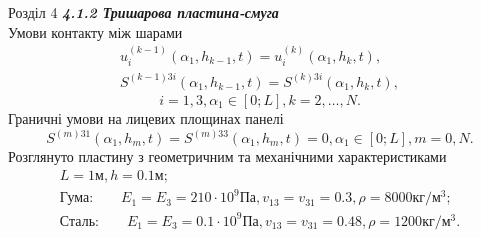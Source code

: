 \documentclass[8pt]{beamer}
\numberwithin{figure}{section}
\numberwithin{equation}{section}
\numberwithin{table}{section}
\begin{document}
\begin{frame}{Розділ 4}
\textbf{\textit{4.1.2 Тришарова пластина-смуга}}
\\
Умови контакту між шарами
\begin{gather}
u_i^{(k-1)}\left(\alpha_1, h_{k-1},t \right)=u_i^{(k)}\left(\alpha_1, h_{k},t \right),\\
S^{(k-1)3i}\left(\alpha_1, h_{k-1},t \right)=S^{(k)3i}\left(\alpha_1, h_{k},t \right),
\end{gather}
\[ i=1,3, \alpha_1 \in [0;L], k=2,\dots,N.\]
Граничні умови на лицевих площинах панелі
\begin{equation}
S^{(m)31}\left(\alpha_1, h_{m},t \right)=S^{(m)33}\left(\alpha_1, h_{m},t \right)=0,\alpha_1 \in [0;L], m=0,N.
\end{equation}
Розглянуто пластину з геометричним та механічними характеристиками
\begin{gather*}
L=1\text{м}, h=0.1\text{м};\\
\text{Гума:}\qquad
E_1=E_3=210\cdot 10^{9} Па, v_{13}=v_{31}=0.3, \rho=8000 кг/м^3;\\
\text{Сталь:}\qquad
E_1=E_3=0.1\cdot 10^{9} Па, v_{13}=v_{31}=0.48, \rho=1200 кг/м^3.
\end{gather*}


\end{frame}
\end{document}
